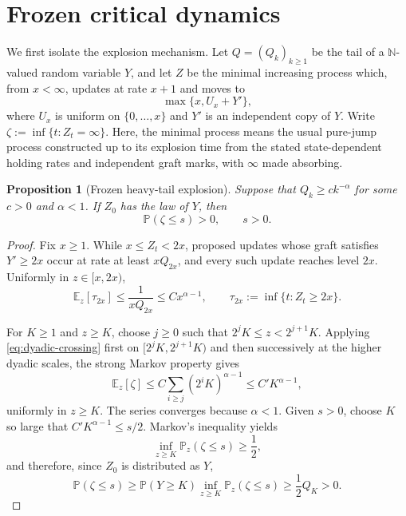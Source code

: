 \documentclass[11pt,a4paper]{amsart}
\newtheorem{proposition}[theorem]{Proposition}
\theoremstyle{remark}
\newcommand{\N}{\mathbb N}
\begin{document}
\section{Frozen critical dynamics}
\label{sec:frozen-dynamics}

We first isolate the explosion mechanism. Let \(Q=(Q_k)_{k\geq1}\) be the
tail of a \(\N\)-valued random variable \(Y\), and let \(Z\) be the
minimal increasing process which, from \(x<\infty\), updates at rate
\(x+1\) and moves to
\[
        \max\{x,U_x+Y'\},
\]
where \(U_x\) is uniform on \(\{0,\ldots,x\}\) and \(Y'\) is an independent
copy of \(Y\). Write \(\zeta:=\inf\{t:Z_t=\infty\}\).
Here, the minimal process means the usual pure-jump process
constructed up to its explosion time from the stated state-dependent
holding rates and independent graft marks, with \(\infty\) made absorbing.

\begin{proposition}[Frozen heavy-tail explosion]
\label{prop:frozen-heavy-tail}
Suppose that \(Q_k\geq ck^{-\alpha}\) for some \(c>0\) and
\(\alpha<1\). If \(Z_0\) has the law of \(Y\), then
\[
        \mathbb{P}(\zeta\leq s)>0,\qquad s>0.
\]
\end{proposition}

\begin{proof}
Fix \(x\geq1\). While \(x\leq Z_t<2x\), proposed updates whose graft
satisfies \(Y'\geq2x\) occur at rate at least \(xQ_{2x}\), and every such
update reaches level \(2x\). Uniformly in \(z\in[x,2x)\),
\begin{equation}
\label{eq:dyadic-crossing}
        \mathbb{E}_z[\tau_{2x}]
        \leq\frac1{xQ_{2x}}
        \leq Cx^{\alpha-1},
        \qquad
        \tau_{2x}:=\inf\{t:Z_t\geq2x\}.
\end{equation}

For \(K\geq1\) and \(z\geq K\), choose \(j\geq0\) such that
\(2^jK\leq z<2^{j+1}K\). Applying \eqref{eq:dyadic-crossing} first on
\([2^jK,2^{j+1}K)\) and then successively at the higher dyadic scales, the
strong Markov property gives
\[
        \mathbb{E}_z[\zeta]
        \leq
        C\sum_{i\geq j}(2^iK)^{\alpha-1}
        \leq C'K^{\alpha-1},
\]
uniformly in \(z\geq K\).
The series converges because \(\alpha<1\). 
Given \(s>0\), choose \(K\) so large that
\(C'K^{\alpha-1}\leq s/2\). Markov's inequality yields
\[
        \inf_{z\geq K}\mathbb{P}_z(\zeta\leq s)\geq\frac12,
\]
and therefore, since $Z_0$ is distributed as $Y$,
\[
        \mathbb{P}(\zeta\leq s)
        \geq
        \mathbb{P}(Y\geq K)\inf_{z\geq K}\mathbb{P}_z(\zeta\leq s)
        \geq\frac12Q_K>0.
\]
\end{proof}
\end{document}
